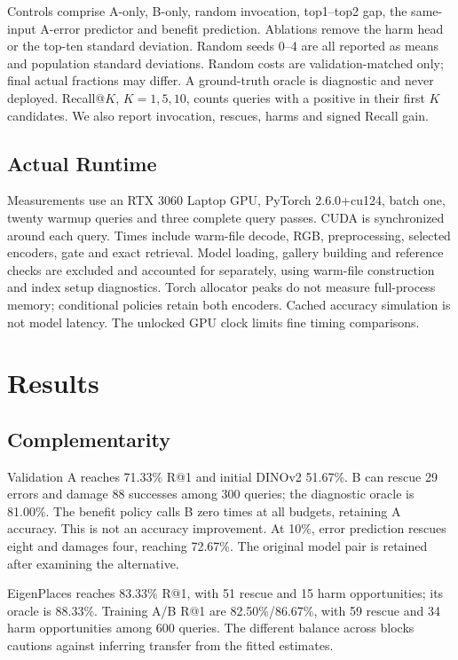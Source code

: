 \documentclass[conference]{IEEEtran}
\begin{document}
Controls comprise A-only, B-only, random invocation, top1--top2 gap,
the same-input A-error predictor and benefit prediction. Ablations remove
the harm head or the top-ten standard deviation. Random seeds 0--4 are
all reported as means and population standard deviations. Random costs
are validation-matched only; final actual fractions may differ.
A ground-truth oracle is diagnostic and never deployed. Recall@$K$,
$K=1,5,10$, counts queries with a positive in their first $K$ candidates.
We also report invocation, rescues, harms and signed Recall gain.

\subsection{Actual Runtime}
Measurements use an RTX 3060 Laptop GPU, PyTorch 2.6.0+cu124,
batch one, twenty warmup queries and three complete query passes.
CUDA is synchronized around each query. Times include warm-file decode,
RGB, preprocessing, selected encoders, gate and exact retrieval. Model
loading, gallery building and reference checks are excluded and accounted
for separately, using warm-file construction and index setup diagnostics.
Torch allocator peaks do not measure full-process memory; conditional
policies retain both encoders. Cached accuracy simulation is not model latency.
The unlocked GPU clock limits fine timing comparisons.

\section{Results}
\subsection{Complementarity}
Validation A reaches 71.33\% R@1 and initial DINOv2 51.67\%. B can rescue
29 errors and damage 88 successes among 300 queries; the diagnostic oracle
is 81.00\%. The benefit policy calls B zero times at all budgets, retaining
A accuracy. This is not an accuracy improvement. At 10\%, error prediction
rescues eight and damages four, reaching 72.67\%. The original model pair
is retained after examining the alternative.

EigenPlaces reaches 83.33\% R@1, with 51 rescue and 15 harm opportunities;
its oracle is 88.33\%. Training A/B R@1 are 82.50\%/86.67\%, with 59 rescue
and 34 harm opportunities among 600 queries. The different balance across
blocks cautions against inferring transfer from the fitted estimates.
\end{document}
